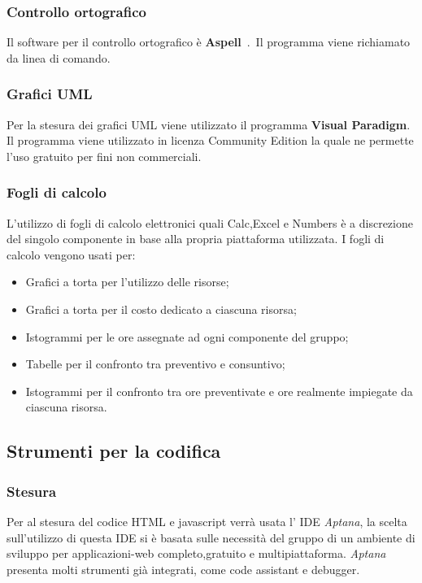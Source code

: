 \subsubsection{Controllo ortografico}

Il software per il controllo ortografico è \textbf{Aspell}\ .\ Il programma viene richiamato da linea di comando.


\subsubsection{Grafici UML} 

Per la stesura dei grafici UML viene utilizzato il programma \textbf{Visual Paradigm}. Il programma viene utilizzato in licenza Community Edition la quale ne permette l’uso gratuito per fini non commerciali.

\subsubsection{Fogli di calcolo}
L'utilizzo di fogli di calcolo elettronici quali Calc,Excel e Numbers è a discrezione del singolo componente in base alla propria piattaforma utilizzata.
I fogli di calcolo vengono usati per:
\begin{itemize}
\item Grafici a torta per l'utilizzo delle risorse;
\item Grafici a torta per il costo dedicato a ciascuna risorsa;
\item Istogrammi per le ore assegnate ad ogni componente del gruppo;
\item Tabelle per il confronto tra preventivo e consuntivo;
\item Istogrammi per il confronto tra ore preventivate e ore realmente impiegate da
ciascuna risorsa.
\end{itemize}

\subsection{Strumenti per la codifica}
\label{sec:strumentiCodifica}
\subsubsection{Stesura}
Per al stesura del codice HTML e javascript verrà usata l' IDE \emph{Aptana}, la scelta sull'utilizzo di questa IDE si è basata sulle necessità del gruppo di un ambiente di sviluppo per applicazioni-web completo,gratuito e multipiattaforma.
\emph{Aptana} presenta molti strumenti già integrati, come code assistant e debugger. 
